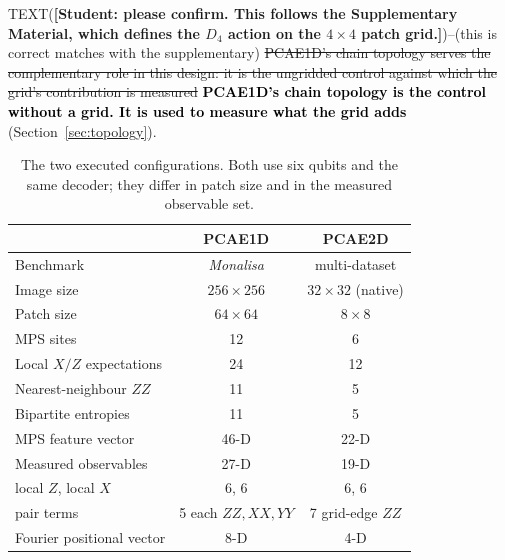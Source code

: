 \documentclass[pdflatex,sn-basic]{sn-jnl}
\newcommand{\del}[1]{\sout{#1}}
\newcommand{\add}[1]{\textbf{\textcolor{black}{#1}}}
\begin{document}
TEXT({\color{red}\textbf{[Student: please confirm. This follows the Supplementary
Material, which defines the $D_4$ action on the $4\times4$ patch grid.]}})--(this is correct matches with the supplementary)
\del{PCAE1D's chain topology serves the complementary role
in this design: it is the ungridded control against which the grid's
contribution is measured} \add{PCAE1D's chain topology is the control without
a grid. It is used to measure what the grid adds} (Section~\ref{sec:topology}).



\begin{table}[t]
	\centering
	\caption{The two executed configurations. Both use six qubits and the same
		decoder; they differ in patch size and in the measured observable set.}
	\label{tab:configurations}
	\begin{tabular}{@{}l c c@{}}
		\toprule
		& PCAE1D                 & PCAE2D                  \\
		\midrule
		Benchmark                     & \textit{Monalisa}     & multi-dataset          \\
		Image size                    & $256\times256$        & $32\times32$ (native)  \\
		Patch size                    & $64\times64$          & $8\times8$             \\
		MPS sites                     & 12                    & 6                      \\
		Local $X/Z$ expectations      & 24                    & 12                     \\
		Nearest-neighbour $ZZ$        & 11                    & 5                      \\
		Bipartite entropies           & 11                    & 5                      \\
		MPS feature vector            & 46-D                  & 22-D                   \\
		\midrule
		Measured observables          & 27-D                  & 19-D                   \\
		\quad local $Z$, local $X$    & 6, 6                  & 6, 6                   \\
		\quad pair terms              & 5 each $ZZ,XX,YY$     & 7 grid-edge $ZZ$       \\
		Fourier positional vector     & 8-D                   & 4-D                    \\
		\bottomrule
	\end{tabular}
\end{table}
\end{document}

